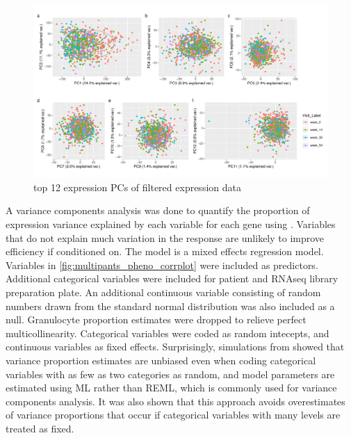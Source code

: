 \begin{outline}

\begin{figure}
    \centering
    \includegraphics[width=1.0\textwidth,page=1]{mainmatter/figures/chapter_04/dream.prcomp.pdf}
    \caption{top 12 expression PCs of filtered expression data}
    \label{fig:multipants_dream_prcomp}
\end{figure}

A variance components analysis was done to quantify the proportion of expression variance explained by each variable for each gene using \autocite{hoffman2016VariancePartitionInterpretingDrivers}.
Variables that do not explain much variation in the response are unlikely to improve efficiency if conditioned on.
The model is a mixed effects regression model.
Variables in \autoref{fig:multipants_pheno_corrplot} were included as predictors.
Additional categorical variables were included for patient and \gls{RNAseq} library preparation plate.
An additional continuous variable consisting of random numbers drawn from the standard normal distribution was also included as a null.
Granulocyte proportion estimates were dropped to relieve perfect multicollinearity.
Categorical variables were coded as random intecepts, and continuous variables as fixed effects.
Surprisingly, simulations from \textcite{hoffman2016VariancePartitionInterpretingDrivers} showed that variance proportion estimates are unbiased even when coding categorical variables with as few as two categories as random, 
and model parameters are estimated using \gls{ML} rather than \gls{REML}, which is commonly used for variance components analysis.
It was also shown that this approach avoids overestimates of variance proportions that occur if categorical variables with many levels are treated as fixed.


\end{outline}
